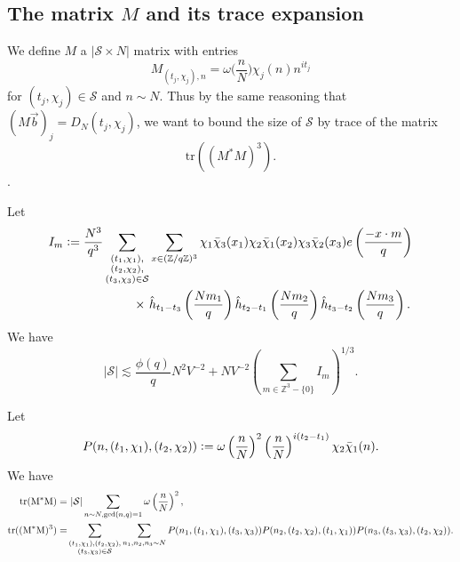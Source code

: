 \subsection{The matrix $M$ and its trace expansion}
We define $M$ a $|\mathcal{S}\times N|$ matrix with entries
\[
    M_{(t_j,\chi_j),n} = \omega\Big(\frac{n}{N}\Big)\chi_j(n)n^{it_j}
\]
for $(t_j,\chi_j)\in\mathcal{S}$ and $n\sim N$.
Thus by the same reasoning that $(M\vec{b})_j=D_N(t_j,\chi_j)$,
we want to bound the size of $\mathcal{S}$ by trace of the matrix \[
\textrm{tr}((M^*M)^3).
\].

\begin{proposition} \label{setup_poisson}
    Let  \begin{align*}
        I_m\defeq\frac{N^3}{q^3}\sum_{\substack{(t_1,\chi_1),\\(t_2,\chi_2),\\(t_3,\chi_3)\in\mathcal{S}}} &\sum_{x\in (\mathbb{Z}/q\mathbb{Z})^3}\chi_1\bar{\chi}_3(x_1)\chi_2\bar{\chi}_1(x_2)\chi_3\bar{\chi}_2(x_3) e\left(\frac{-x\cdot m}{q}\right)\\
        \times \ &\hat{h}_{t_1-t_3}\left(\frac{Nm_1}{q}\right)\hat{h}_{t_2-t_1}\left(\frac{Nm_2}{q}\right)\hat{h}_{t_3-t_2}\left(\frac{Nm_3}{q}\right).
    \end{align*}
    We have \[
    |\mathcal{S}|\lesssim \frac{\phi(q)}{q}N^2V^{-2}+ NV^{-2}\left(\sum_{m\in\mathbb{Z}^3 - \{0\}} I_m\right)^{1/3}.
    \]
\end{proposition}
\begin{lemma}
    Let \[
    P(n,(t_1,\chi_1),(t_2,\chi_2))\mathrel{\mathop:}= \omega\left(\frac{n}{N}\right)^2 \left(\frac{n}{N}\right)^{i(t_2-t_1)}\chi_2\bar{\chi}_1(n).
    \]
    We have 
    \begin{align*}
        \rm{tr}(M^*M) = & \ |\mathcal{S}|\sum_{n\sim N, \gcd (n,q)=1} \omega\left(\frac{n}{N}\right)^2, \\
        \rm{tr}((M^*M)^3)=&\sum_{\substack{(t_1,\chi_1),(t_2,\chi_2),\\(t_3,\chi_3)\in\mathcal{S}}}\sum_{n_1,n_2,n_3\sim N} 
        P(n_1,(t_1,\chi_1),(t_3,\chi_3))P(n_2,(t_2,\chi_2),(t_1,\chi_1))P(n_3,(t_3,\chi_3),(t_2,\chi_2)).
    \end{align*}
\end{lemma}
